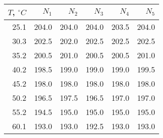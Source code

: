 \begin{tabular}{rrrrrr}
\toprule
$T$, $^\circ C$ & $N_1$ & $N_2$ & $N_3$ & $N_4$ & $N_5$ \\
\midrule
25.1 & 204.0 & 204.0 & 204.0 & 203.5 & 204.0 \\
30.3 & 202.5 & 202.0 & 202.5 & 202.5 & 202.5 \\
35.2 & 200.5 & 201.0 & 200.5 & 200.5 & 201.0 \\
40.2 & 198.5 & 199.0 & 199.0 & 199.0 & 199.5 \\
45.2 & 198.0 & 198.0 & 198.0 & 198.0 & 198.0 \\
50.2 & 196.5 & 197.5 & 196.5 & 197.0 & 197.0 \\
55.2 & 194.5 & 195.0 & 195.0 & 195.0 & 195.0 \\
60.1 & 193.0 & 193.0 & 192.5 & 193.0 & 193.0 \\
\bottomrule
\end{tabular}
